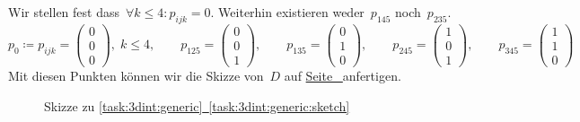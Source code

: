 \documentclass[../full]{subfiles}
\begin{document}
    Wir stellen fest dass~\( \forall k \leq 4 \colon p_{ijk} = 0 \).
    Weiterhin existieren weder~\( p_{145} \) noch~\( p_{235} \).
    \begin{equation*}
        p_0 \coloneqq
        p_{ijk} = \begin{pmatrix} 0 \\ 0 \\ 0 \end{pmatrix},
        \; k \leq 4,
        \qquad
        p_{125} = \begin{pmatrix} 0 \\ 0 \\ 1 \end{pmatrix},
        \qquad
        p_{135} = \begin{pmatrix} 0 \\ 1 \\ 0 \end{pmatrix},
        \qquad
        p_{245} = \begin{pmatrix} 1 \\ 0 \\ 1 \end{pmatrix},
        \qquad
        p_{345} = \begin{pmatrix} 1 \\ 1 \\ 0 \end{pmatrix}
    \end{equation*}
    Mit diesen Punkten k\"onnen wir die Skizze von~\( D \)
    auf \hyperref[task:3dint:generic:sketch:visual]{%
        Seite~\pageref*{task:3dint:generic:sketch:visual}%
    } anfertigen.

    \begin{figure}
        \centering

        \caption*{%
            Skizze zu
            \hyperref[task:3dint:generic:sketch]{%
                \ref*{task:3dint:generic}~\ref*{task:3dint:generic:sketch}%
            }%
        }
        \label{task:3dint:generic:sketch:visual}
    \end{figure}


\end{document}
